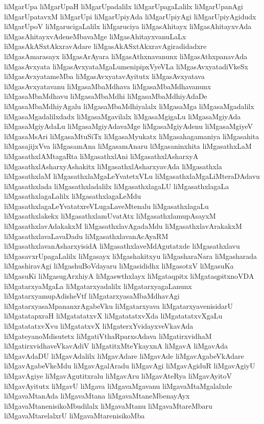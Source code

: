 {liMgarUpa
liMgarUpaH
liMgarUpadalilx
liMgarUpagaLalilx
liMgarUpanAgi
liMgarUpatavxM
liMgarUpi
liMgarUpiyAda
liMgarUpiyAgi
liMgarUpiyAgidudx
liMgarUpoV
liMgarucigaLalilx
liMgaruciya
liMgasAhitayx
liMgasAhitayxvAda
liMgasAhitayxvAdeneMbavaMge
liMgasAhitayxvanuLaLx
liMgasAkASxtAkxravAdare
liMgasAkASxtAkxravAgiradidadxre
liMgasAmarasayx
liMgasArAyara
liMgasAthxnavanunx
liMgasAthxpanavAda
liMgasAvxyata
liMgasAvxyataMgaLumenipipxVyeVLa
liMgasAvxyatadiVkeSx
liMgasAvxyatameMba
liMgasAvxyatavAyitutx
liMgasAvxyatava
liMgasAvxyatavanu
liMgasaMbaMdhava
liMgasaMbaMdhavanunx
liMgasaMbaMdhavu
liMgasaMbaMdhi
liMgasaMbaMdhiyAdaDe
liMgasaMbaMdhiyAgalu
liMgasaMbaMdhiyalalx
liMgasaMga
liMgasaMgadalilx
liMgasaMgadalilxdadx
liMgasaMgavilalx
liMgasaMgigaLu
liMgasaMgiyAda
liMgasaMgiyAdaLu
liMgasaMgiyAdavaMge
liMgasaMgiyAdenu
liMgasaMgiyeV
liMgasaMsAri
liMgasaMtuSiTx
liMgasaMyukatx
liMgasahagamaniya
liMgasahita
liMgasajijxVva
liMgasamAna
liMgasamAnaru
liMgasaninxhita
liMgasathxLaM
liMgasathxlAMtagaRta
liMgasathxlAni
liMgasathxlAsharxyA
liMgasathxlAsharxyAshakitx
liMgasathxlAsharxyavAda
liMgasathxla
liMgasathxlaM
liMgasathxlaMgaLeYvatetxVLu
liMgasathxlaMgaLiMteraDAdavu
liMgasathxlada
liMgasathxladalilx
liMgasathxlagaLU
liMgasathxlagaLa
liMgasathxlagaLalilx
liMgasathxlagaLeMdu
liMgasathxlagaLeYvatatxreVLugaLaveMtenalu
liMgasathxlagaLu
liMgasathxlakekx
liMgasathxlamUvatAtx
liMgasathxlamupAsayxM
liMgasathxlavAdakakxM
liMgasathxlavAgadaMdu
liMgasathxlavArakakxM
liMgasathxlavaLavaDadu
liMgasathxlavanAcAyaRM
liMgasathxlavanAsharxyisidA
liMgasathxlaveMdAgutatxde
liMgasathxlavu
liMgasavxrUpagaLalilx
liMgasayx
liMgashakitxyu
liMgasharaNara
liMgasharada
liMgashiravAgi
liMgashuBoVdayaru
liMgasididhx
liMgasotxV
liMgasuKa
liMgasuKi
liMgasugArxhiyA
liMgaswthxlayx
liMgataqpitx
liMgataqpitxnoVDA
liMgatarxyaMgaLa
liMgatarxyadalilx
liMgatarxyagaLanunx
liMgatarxyamupAdisheVtf
liMgatarxyasaMbaMdhavAgi
liMgatarxyasaMpananxrAgabeVku
liMgatarxyava
liMgatarxyavenisidarU
liMgatatapxraH
liMgatatatxvX
liMgatatatxvXda
liMgatatatxvXgaLu
liMgatatatxvXvu
liMgatatxvX
liMgaterxYvidayxveVkavAda
liMgateyanoMdisutetx
liMgatiVthaRparxsAdava
liMgatirxvidhaM
liMgatirxvidhaveVkavAdiV
liMgatitxMteYkayxnA
liMgavA
liMgavAda
liMgavAdaDU
liMgavAdalilx
liMgavAdare
liMgavAde
liMgavAgabeVkAdare
liMgavAgabeVkeMdu
liMgavAgalAradu
liMgavAgi
liMgavAgiduR
liMgavAgiyU
liMgavAgiye
liMgavAgutitxralu
liMgavAru
liMgavAteRya
liMgavAyitoV
liMgavAyitutx
liMgavU
liMgava
liMgavaMgavanu
liMgavaMtaMgalalxde
liMgavaMtanAda
liMgavaMtana
liMgavaMtaneMbenayAyx
liMgavaMtanenisikoMbudilalx
liMgavaMtanu
liMgavaMtareMbaru
liMgavaMtarelalxrU
liMgavaMtarenisikoMba
}
